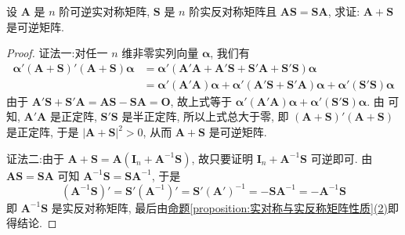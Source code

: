 \documentclass[../../main.tex]{subfiles}%
\begin{document}
\begin{proposition}\label{proposition:可逆实对称与实反称阵可交换则相加也可逆}
设 \(\boldsymbol{A}\) 是 \(n\) 阶可逆实对称矩阵, \(\boldsymbol{S}\) 是 \(n\) 阶实反对称矩阵且 \(\boldsymbol{A}\boldsymbol{S}=\boldsymbol{S}\boldsymbol{A}\), 求证: \(\boldsymbol{A}+\boldsymbol{S}\) 是可逆矩阵.
\end{proposition}
\begin{proof}

{\color{blue}证法一:}对任一 \(n\) 维非零实列向量 \(\boldsymbol{\alpha}\), 我们有
\begin{align*}
\boldsymbol{\alpha}'(\boldsymbol{A}+\boldsymbol{S})'(\boldsymbol{A}+\boldsymbol{S})\boldsymbol{\alpha}&=\boldsymbol{\alpha}'(\boldsymbol{A}'\boldsymbol{A}+\boldsymbol{A}'\boldsymbol{S}+\boldsymbol{S}'\boldsymbol{A}+\boldsymbol{S}'\boldsymbol{S})\boldsymbol{\alpha}\\
&=\boldsymbol{\alpha}'(\boldsymbol{A}'\boldsymbol{A})\boldsymbol{\alpha}+\boldsymbol{\alpha}'(\boldsymbol{A}'\boldsymbol{S}+\boldsymbol{S}'\boldsymbol{A})\boldsymbol{\alpha}+\boldsymbol{\alpha}'(\boldsymbol{S}'\boldsymbol{S})\boldsymbol{\alpha}
\end{align*}
由于 \(\boldsymbol{A}'\boldsymbol{S}+\boldsymbol{S}'\boldsymbol{A}=\boldsymbol{A}\boldsymbol{S}-\boldsymbol{S}\boldsymbol{A}=\boldsymbol{O}\), 故上式等于 \(\boldsymbol{\alpha}'(\boldsymbol{A}'\boldsymbol{A})\boldsymbol{\alpha}+\boldsymbol{\alpha}'(\boldsymbol{S}'\boldsymbol{S})\boldsymbol{\alpha}\). 由 可知, \(\boldsymbol{A}'\boldsymbol{A}\) 是正定阵, \(\boldsymbol{S}'\boldsymbol{S}\) 是半正定阵, 所以上式总大于零, 即 \((\boldsymbol{A}+\boldsymbol{S})'(\boldsymbol{A}+\boldsymbol{S})\) 是正定阵, 于是 \(|\boldsymbol{A}+\boldsymbol{S}|^2>0\), 从而 \(\boldsymbol{A}+\boldsymbol{S}\) 是可逆矩阵.

{\color{blue}证法二:}由于 \(\boldsymbol{A}+\boldsymbol{S}=\boldsymbol{A}(\boldsymbol{I}_n+\boldsymbol{A}^{-1}\boldsymbol{S})\), 故只要证明 \(\boldsymbol{I}_n+\boldsymbol{A}^{-1}\boldsymbol{S}\) 可逆即可. 由 \(\boldsymbol{A}\boldsymbol{S}=\boldsymbol{S}\boldsymbol{A}\) 可知 \(\boldsymbol{A}^{-1}\boldsymbol{S}=\boldsymbol{S}\boldsymbol{A}^{-1}\), 于是
\[
(\boldsymbol{A}^{-1}\boldsymbol{S})'=\boldsymbol{S}'(\boldsymbol{A}^{-1})'=\boldsymbol{S}'(\boldsymbol{A}')^{-1}=-\boldsymbol{S}\boldsymbol{A}^{-1}=-\boldsymbol{A}^{-1}\boldsymbol{S}
\]
即 \(\boldsymbol{A}^{-1}\boldsymbol{S}\) 是实反对称矩阵, 最后由\hyperref[proposition:实对称与实反称矩阵性质]{命题\ref{proposition:实对称与实反称矩阵性质}(2)}即得结论.
\end{proof}
\end{document}
